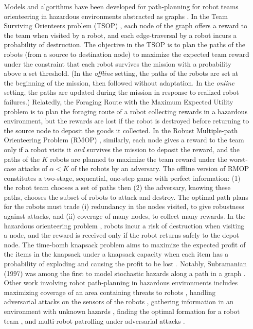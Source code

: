 \documentclass[fleqn,10pt,lineno]{wlpeerj}
\begin{document}
Models and algorithms have been developed for path-planning for robot teams orienteering in hazardous environments abstracted as graphs \cite{zhou2021multi}. 
In the Team Surviving Orienteers problem (TSOP) \cite{jorgensen2018team,jorgensen2017matroid,jorgensen2024matroid}, each node of the graph offers a reward to the team when visited by a robot, and each edge-traversal by a robot incurs a probability of destruction. 
The objective in the TSOP is to plan the paths of the robots (from a source to destination node) to maximize the expected team reward under the constraint that each robot survives the mission with a probability above a set threshold. 
(In the \emph{offline} setting, the paths of the robots are set at the beginning of the mission, then followed without adaptation. In the \emph{online} setting, the paths are updated during the mission in response to realized robot failures.)
Relatedly, the Foraging Route with the Maximum Expected Utility problem \cite{di2022foraging} is to plan the foraging route of a robot collecting rewards in a hazardous environment, but the rewards are lost if the robot is destroyed before returning to the source node to deposit the goods it collected.
In the Robust Multiple-path Orienteering Problem (RMOP) \cite{shi2023robust}, similarly, each node gives a reward to the team only if a robot visits it \emph{and} survives the mission to deposit the reward, and the paths of the $K$ robots are planned to maximize the team reward under the worst-case attacks of $\alpha<K$ of the robots by an adversary. 
The offline version of RMOP constitutes a two-stage, sequential, one-step game with perfect information: (1) the robot team chooses a set of paths then (2) the adversary, knowing these paths, chooses the subset of robots to attack and destroy. 
The optimal path plans for the robots must trade (i) redundancy in the nodes visited, to give robustness against attacks, and (ii) coverage of many nodes, to collect many rewards.
In the hazardous orienteering problem \cite{santini2023hazardous,montemanni2025exact}, robots incur a risk of destruction when visiting a node, and the reward is received only if the robot returns safely to the depot node.
The time-bomb knapsack problem aims to maximize the expected profit of the items in the knapsack under a knapsack capacity when each item has a probability of exploding and causing the profit to be lost \cite{monaci2022exact}.
Notably, Subramanian (1997) was among the first to model stochastic hazards along a path in a graph \cite{sherali1997low}.
Other work involving robot path-planning in hazardous environments includes 
maximizing coverage of an area containing threats to robots \cite{korngut2023multi,yehoshua2016robotic}, 
handling adversarial attacks on the sensors of the robots \cite{liu2021distributed,zhou2022distributed,mayya2022adaptive,zhou2018resilient}, 
gathering information in an environment with unknown hazards \cite{schwager2017multi},
finding the optimal formation for a robot team \cite{shapira2015path},
and 
multi-robot patrolling under adversarial attacks \cite{huang2019survey}.
\end{document}
